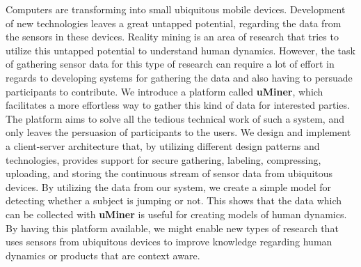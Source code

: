 
Computers are transforming into small ubiquitous mobile devices. Development of new technologies leaves a great untapped potential, regarding the data from the sensors in these devices. 
Reality mining is an area of research that tries to utilize this untapped potential to understand human dynamics. However, the task of gathering sensor data for this type of research can require a lot of effort in regards to developing systems for gathering the data and also having to persuade participants to contribute.
We introduce a platform called \textbf{uMiner}, which facilitates a more effortless way to gather this kind of data for interested parties. The platform aims to solve all the tedious technical work of such a system, and only leaves the persuasion of participants to the users.
We design and implement a client-server architecture that, by utilizing different design patterns and technologies, provides support for secure gathering, labeling, compressing, uploading, and storing the continuous stream of sensor data from ubiquitous devices. 
By utilizing the data from our system, we create a simple model for detecting whether a subject is jumping or not. This shows that the data which can be collected with \textbf{uMiner} is useful for creating models of human dynamics.  
By having this platform available, we might enable new types of research that uses sensors from ubiquitous devices to improve knowledge regarding human dynamics or products that are context aware.